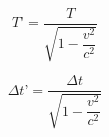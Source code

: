 \documentclass[10pt, a5paper]{article}
\begin{document}

$$
T\text{'} = \dfrac{T}{\sqrt{1 - \dfrac{v^2}{c^2} }}
$$


$$
\Delta t\text{'} = \dfrac{\Delta t}{\sqrt{1 - \dfrac{v^2}{c^2} }}
$$

\end{document}
